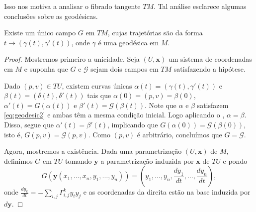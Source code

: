 Isso nos motiva a analisar o fibrado tangente $TM$. Tal análise esclarece algumas conclusões sobre as geodésicas.
\begin{lemma}
    \label{lem:campo-geodesico}
    Existe um único campo $G$ em $TM$, cujas trajetórias são da forma $t \to(\gamma(t),\gamma'(t))$, onde $\gamma$ é uma geodésica em $M$.
    \begin{proof}

        Mostremos primeiro a unicidade.
        Seja $(U, \mathbf{x})$ um sistema de coordenadas em $M$ e suponha que $G$ e $\mathcal{G}$ sejam dois campos em $TM$ satisfazendo a hipótese.

        Dado $(p,v) \in TU$, existem curvas únicas $\alpha(t)=(\gamma(t), \gamma'(t))$ e $\beta(t)=(\delta(t), \delta'(t))$ tais que $\alpha(0)=(p,v)=\beta(0)$, $\alpha'(t) = G(\alpha(t))$ e $\beta'(t)=\mathcal{G}(\beta(t))$.
        Note que $\alpha$ e $\beta$ satisfazem \eqref{eq:geodesic2} e ambas têm a mesma condição inicial. Logo aplicando o , $\alpha=\beta$.
        Disso, segue que $\alpha'(t)=\beta'(t)$, implicando que $G(\alpha(0))=\mathcal{G}(\beta(0))$, isto é, $G(p,v)=\mathcal{G}(p,v)$.
        Como $(p,v)$ é arbitrário, concluímos que $G=\mathcal{G}$.

        Agora, mostremos a existência.
        Dada uma parametrização $(U,\mathbf{x})$ de $M$, definimos $G$ em $TU$ tomando $\mathbf{y}$ a parametrização induzida por $\mathbf{x}$ de $TU$ e pondo
        \begin{equation*}
            G(\mathbf{y}(x_{1}, \dots, x_{n}, y_{1}, \dots, y_{n}))=\left( y_{1}, \dots, y_{n}, \frac{dy_{1}}{dt}, \dots, \frac{dy_{n}}{dt} \right),
        \end{equation*}
        onde $\frac{dy_{k}}{dt}=-\sum_{i,j}\Gamma_{i,j}^{k}y_{i}y_{j}$ e as coordenadas da direita estão na base induzida por $d\mathbf{y}$.


\end{proof}
\end{lemma}
